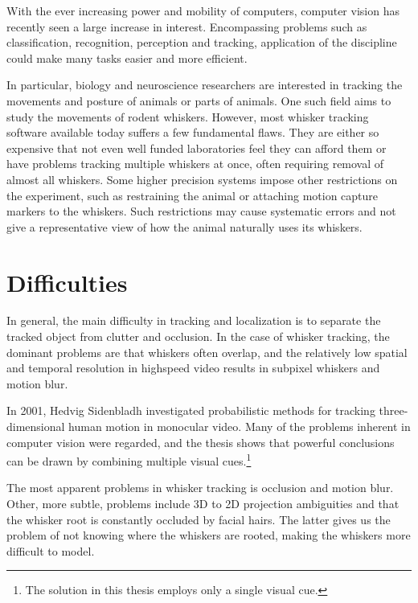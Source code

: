 With the ever increasing power and mobility of computers, computer
vision has recently seen a large increase in interest.  Encompassing
problems such as classification, recognition, perception and tracking,
application of the discipline could make many tasks easier and more
efficient.

In particular, biology and neuroscience researchers are interested in
tracking the movements and posture \cite{WhiskerVideography} of
animals or parts of animals.  One such field aims to study the
movements of rodent whiskers. However, most whisker tracking software
available today suffers a few fundamental flaws.  They are either so
expensive that not even well funded laboratories feel they can afford
them or have problems tracking multiple whiskers at once, often
requiring removal of almost all whiskers.  Some higher precision
systems impose other restrictions on the experiment, such as
restraining the animal or attaching motion capture markers to the
whiskers. \cite{BadExample1} Such restrictions may cause systematic
errors and not give a representative view of how the animal naturally
uses its whiskers.

\section{Difficulties}
In general, the main difficulty in tracking and localization is to
separate the tracked object from clutter and occlusion. In the case of
whisker tracking, the dominant problems are that whiskers often
overlap, and the relatively low spatial and temporal resolution in
highspeed video results in subpixel whiskers and motion
blur. \cite{WhiskerVideography}

In 2001, Hedvig Sidenbladh investigated probabilistic methods for
tracking three-dimensional human motion in monocular
video. \cite{Hedvig} Many of the problems inherent in computer vision
were regarded, and the thesis shows that powerful conclusions can be
drawn by combining multiple visual cues.\footnote{The solution in this
thesis employs only a single visual cue.}

The most apparent problems in whisker tracking is occlusion and motion
blur. Other, more subtle, problems include 3D to 2D projection
ambiguities and that the whisker root is constantly occluded by facial
hairs. The latter gives us the problem of not knowing where the
whiskers are rooted, making the whiskers more difficult to model.

